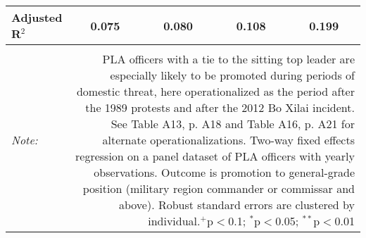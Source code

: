\begin{table}[!htbp]
\begin{tabular}{@{\extracolsep{5pt}}lcccc}
Adjusted R$^{2}$ & 0.075 & 0.080 & 0.108 & 0.199 \\ 
\hline 
\hline \\[-1.8ex] 
\textit{Note:}  & \multicolumn{4}{r}{PLA officers with a tie to the sitting top leader are especially likely to be promoted during periods of domestic threat, here operationalized as the period after the 1989 protests and after the 2012 Bo Xilai incident. See Table A13, p. A18 and Table A16, p. A21 for alternate operationalizations. Two-way fixed effects regression on a panel dataset of PLA officers with yearly observations. Outcome is promotion to general-grade position (military region commander or commissar and above). Robust standard errors are clustered by individual.$^{+}$p$<$0.1; $^{*}$p$<$0.05; $^{**}$p$<$0.01}} \\ 
\end{tabular} 
\end{table} 
